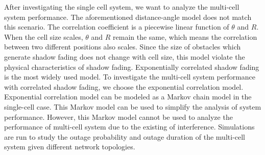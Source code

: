 \par After investigating the single cell system, we want to analyze the multi-cell system performance. The aforementioned distance-angle model does not match this scenario. The correlation coefficient is a piecewise linear function of $\theta$ and $R$. When the cell size scales, $\theta$ and $R$ remain the same, which means the correlation between two different positions also scales. Since the size of obstacles which generate shadow fading does not change with cell size, this model violate the physical characteristics of shadow fading. Exponentially correlated shadow fading is the most widely used model. To investigate the multi-cell system performance with correlated shadow fading, we choose the exponential correlation model. Exponential correlation model can be modeled as a Markov chain model in the single-cell case. This Markov model can be used to simplify the analysis of system performance. However, this Markov model cannot be used to analyze the performance of multi-cell system due to the existing of interference. Simulations are run to study the outage probability and outage duration of the multi-cell system given different network topologies. 
